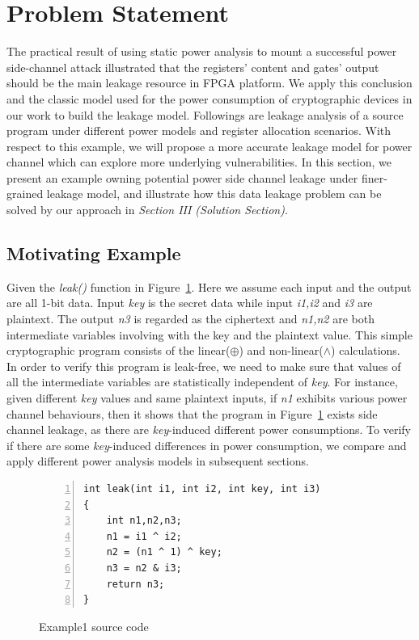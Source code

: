 \documentclass[10pt, conference]{IEEEtran}
\begin{document}
\section{Problem Statement}
The practical result\cite{moradi2014side} of using static power analysis to mount a successful power side-channel attack illustrated that the registers' content and gates' output should be the main leakage resource in FPGA platform. We apply this conclusion and the classic model\cite{brier2004correlation} used for the power consumption of cryptographic devices in our work to build the leakage model. Followings are leakage analysis of a source program under different power models and register allocation scenarios. With respect to this example, we will propose a more accurate leakage model for power channel which can explore more underlying vulnerabilities. In this section, we present an example owning potential power side channel leakage under finer-grained leakage model, and illustrate how this data leakage problem can be solved by our approach in \emph{Section III (Solution Section)}. 
\subsection{Motivating Example}
Given the \emph{leak()} function in Figure~\ref{example1}. Here we assume each input and the output are all 1-bit data. Input \emph{key} is the secret data while input \emph{i1,i2} and \emph{i3} are plaintext. The output \emph{n3} is regarded as the ciphertext and \emph{n1,n2} are both intermediate variables involving with the key and the plaintext value. This simple  cryptographic program consists of the linear($\oplus$) and non-linear($\wedge$) calculations. In order to verify this program is leak-free, we need to make sure that values of all the intermediate variables are statistically independent of \emph{key}. For instance, given different \emph{key} values and same plaintext inputs, if \emph{n1} exhibits various power channel behaviours, then it shows that the program in Figure~\ref{example1} exists side channel leakage, as there are \emph{key}-induced different power consumptions. To verify if there are some \emph{key}-induced differences in power consumption, we compare and apply different power analysis models in subsequent sections.

\begin{figure}[hbt!]
\centering
\begin{minipage}{.95\linewidth}
\begin{lstlisting}[language={[ANSI]C},numbers=left,numberstyle=\tiny, basicstyle=\ttfamily\small, frame=none]
int leak(int i1, int i2, int key, int i3)
{
	int n1,n2,n3;
	n1 = i1 ^ i2;
	n2 = (n1 ^ 1) ^ key;
	n3 = n2 & i3;
	return n3;
}

\end{lstlisting}
\end{minipage}
\caption{Example1 source code}
\label{example1}
\end{figure}
\end{document}
